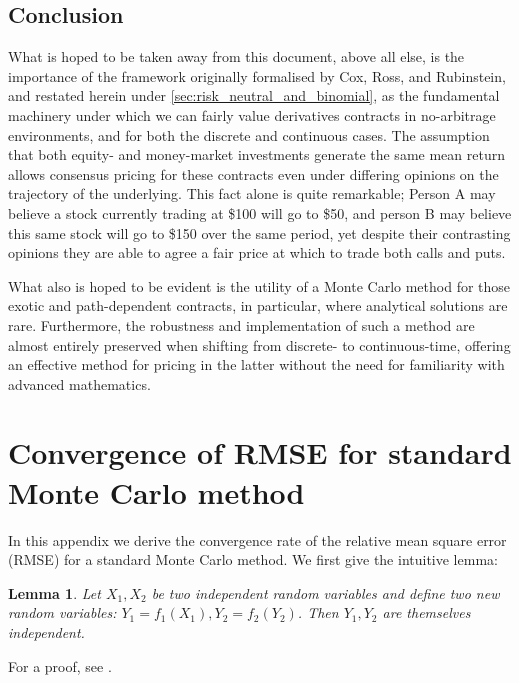 \documentclass[]{article}
\theoremstyle{remark}
\theoremstyle{plain}
\newtheorem*{lemma}{Lemma}
\begin{document}
\subsection{Conclusion}

What is hoped to be taken away from this document, above all else, is the importance of the framework originally formalised by Cox, Ross, and Rubinstein, and restated herein under \cref{sec:risk_neutral_and_binomial}, as the fundamental machinery under which we can fairly value derivatives contracts in no-arbitrage environments, and for both the discrete and continuous cases. The assumption that both equity- and money-market investments generate the same mean return allows consensus pricing for these contracts even under differing opinions on the trajectory of the underlying. This fact alone is quite remarkable; Person A may believe a stock currently trading at \$100 will go to \$50, and person B may believe this same stock will go to \$150 over the same period, yet despite their contrasting opinions they are able to agree a fair price at which to trade both calls and puts.

What also is hoped to be evident is the utility of a Monte Carlo method for those exotic and path-dependent contracts, in particular, where analytical solutions are rare. Furthermore, the robustness and implementation of such a method are almost entirely preserved when shifting from discrete- to continuous-time, offering an effective method for pricing in the latter without the need for familiarity with advanced mathematics.

\printbibliography

\clearpage

\appendix

\section{Convergence of RMSE for standard Monte Carlo method}\label{app:mc_convergence}

In this appendix we derive the convergence rate of the relative mean square error (RMSE) for a standard Monte Carlo method. We first give the intuitive lemma:
\begin{lemma}
	Let $X_1,X_2$ be two independent random variables and define two new random variables: $Y_1 = f_1(X_1), Y_2 = f_2(Y_2)$. Then $Y_1,Y_2$ are themselves independent.
\end{lemma}
\noindent For a proof, see \cite[Thm~4.3.5]{CASELLA_BERGER_2002}.
\end{document}
